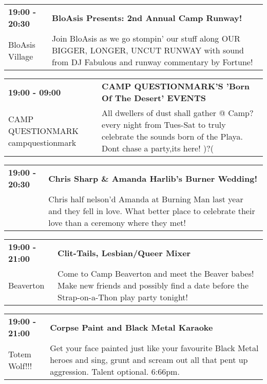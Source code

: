 \begin{tabular}{ p{1in} p{2.2in} }
    \textbf{19:00 - 20:30} & \textbf{BloAsis Presents: 2nd Annual Camp Runway!} \\
    BloAsis Village \newline  & Join BloAsis as we go stompin' our stuff along OUR BIGGER, LONGER, UNCUT RUNWAY with sound from DJ Fabulous and runway commentary by Fortune! \\
    \hline 
\end{tabular}
    
\begin{tabular}{ p{1in} p{2.2in} }
    \textbf{19:00 - 09:00} & \textbf{CAMP QUESTIONMARK'S 'Born Of The Desert' EVENTS  } \\
    CAMP QUESTIONMARK \newline campquestionmark & All dwellers of dust shall gather @ Camp? every night from Tues-Sat to truly celebrate the sounds born of the Playa. Dont chase a party,its here!
)?( \\
    \hline 
\end{tabular}
    
\begin{tabular}{ p{1in} p{2.2in} }
    \textbf{19:00 - 20:30} & \textbf{Chris Sharp \& Amanda Harlib's Burner Wedding!} \\
    ~ \newline  & Chris half nelson'd Amanda at Burning Man last year and they fell in love. What better place to celebrate their love than a ceremony where they met! \\
    \hline 
\end{tabular}
    
\begin{tabular}{ p{1in} p{2.2in} }
    \textbf{19:00 - 21:00} & \textbf{Clit-Tails, Lesbian/Queer Mixer } \\
    Beaverton \newline  & Come to Camp Beaverton and meet the Beaver babes! Make new friends and possibly find a date before the Strap-on-a-Thon play party tonight! \\
    \hline 
\end{tabular}
    
\begin{tabular}{ p{1in} p{2.2in} }
    \textbf{19:00 - 21:00} & \textbf{Corpse Paint and Black Metal Karaoke} \\
    Totem Wolf!!! \newline  & Get your face painted just like your favourite Black Metal heroes and sing, grunt and scream out all that pent up aggression. Talent optional. 6:66pm. \\
    \hline 
\end{tabular}
    
